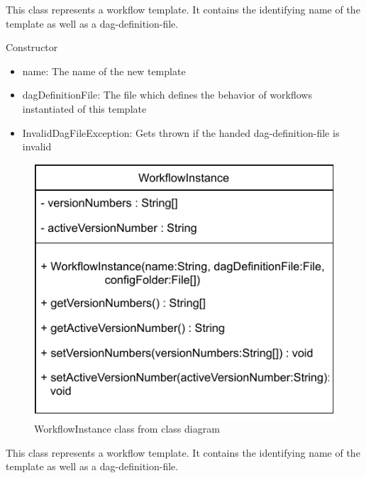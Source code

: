 This class represents a workflow template. It contains the identifying name of the template as well as a dag-definition-file.

\begin{methodenv}{Constructor}


\begin{itemize}
	\item{name:}
	The name of the new template
	\item{dagDefinitionFile:}
	The file which defines the behavior of workflows instantiated of this template
\end{itemize}

\begin{itemize}
	\item{InvalidDagFileException:}
	Gets thrown if the handed dag-definition-file is invalid
\end{itemize}
\end{methodenv}



\begin{figure}[h]
\centerline{\includegraphics[scale=1]{res/Klassen/WorkflowInstance.pdf}}
\caption{WorkflowInstance class from class diagram}
\end{figure}

This class represents a workflow template. It contains the identifying name of the template as well as a dag-definition-file.

